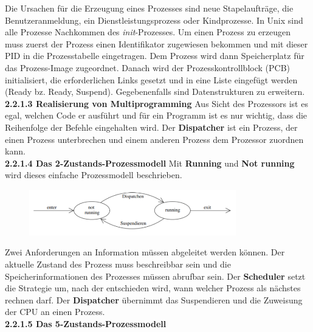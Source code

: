 \documentclass{article}
\begin{document}
    Die Ursachen für die Erzeugung eines Prozesses sind neue Stapelaufträge, die Benutzeranmeldung, ein Dienstleistungsprozess oder Kindprozesse.\newline
    In Unix sind alle Prozesse Nachkommen des \textit{init}-Prozesses.\newline
    Um einen Prozess zu erzeugen muss zuerst der Prozess einen Identifikator zugewiesen bekommen und mit dieser PID in die Prozesstabelle eingetragen. Dem Prozess wird dann Speicherplatz für das Prozess-Image zugeordnet. Danach wird der Prozesskontrollblock (PCB) initialisiert, die erforderlichen Links gesetzt und in eine Liste eingefügt werden (Ready bz. Ready, Suspend). Gegebenenfalls sind Datenstrukturen zu erweitern.\newline
    \\
    \textbf{2.2.1.3 Realisierung von Multiprogramming}\newline
    Aus Sicht des Prozessors ist es egal, welchen Code er ausführt und für ein Programm ist es nur wichtig, dass die Reihenfolge der Befehle eingehalten wird. Der \textbf{Dispatcher} ist ein Prozess, der einen Prozess unterbrechen und einem anderen Prozess dem Prozessor zuordnen kann.\newline
    \\
    \textbf{2.2.1.4 Das 2-Zustands-Prozessmodell}\newline
    Mit \textbf{Running} und \textbf{Not running} wird dieses einfache Prozessmodell beschrieben.
    \begin{figure}[h]
        \centering
	    \includegraphics[width=90mm]{Skizzen/2. Kapitel/2-Zustandsmodell.png}
    \end{figure}
    Zwei Anforderungen an Information müssen abgeleitet werden können. Der aktuelle Zustand des Prozess muss beschreibbar sein und die Speicherinformationen des Prozesses müssen abrufbar sein.\newline
    Der \textbf{Scheduler} setzt die Strategie um, nach der entschieden wird, wann welcher Prozess als nächstes rechnen darf. Der \textbf{Dispatcher} übernimmt das Suspendieren und die Zuweisung der CPU an einen Prozess.\newline
    \\
    \textbf{2.2.1.5 Das 5-Zustands-Prozessmodell}\newline
\end{document}
